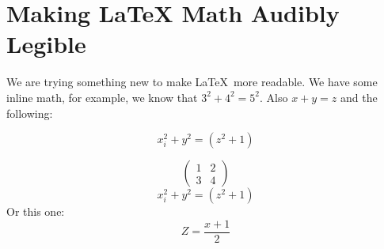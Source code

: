 \documentclass{article}
\newcommand{\mymat}[1]{\begin{pmatrix} #1 \end{pmatrix}}
\begin{document}
\section{Making \LaTeX{} Math Audibly Legible}

We are trying something new to make \LaTeX\ more readable. We have some inline math, for example, we know that $3^2 + 4^2 = 5^{2}$. Also \(x + y = z\) and the following:

\begin{equation}
       x_i^2 + y^2 = (z^2 + 1)
    \end{equation}

    \begin{equation*}
        \mymat{ 1 & 2 \\ 3 & 4 }
     \end{equation*} 
\begin{equation}
    x_i^2 + y^2 = (z^2 + 1)
 \end{equation}
Or this one:
    \[
       Z = \frac{x+1}{2}
    \]
\end{document}
